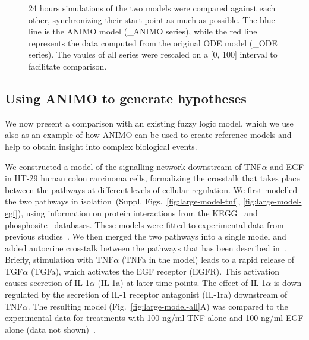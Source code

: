 \documentclass{bmcart}
\begin{document}
\begin{figure}[!htpb]
\begin{center}
\end{center}
\caption{\label{fig:grafici-drosophila-smaller} 24 hours simulations of the two models were compared
against each other, synchronizing their start point as much as possible. The blue line is the ANIMO model
({\sf \_{}ANIMO} series), while the red line represents the data computed from the original ODE model
({\sf \_{}ODE} series). The vaules of all series were rescaled on a [0, 100] interval to facilitate comparison.}
\end{figure}







\subsection*{Using ANIMO to generate hypotheses}\label{subsec:case-study-larger}
We now present a comparison with an existing fuzzy logic model, which we use also as an example of how
ANIMO can be used to create reference models and help to obtain insight into complex biological events.

We constructed a model of the signalling network downstream of TNF$\alpha$ and EGF
in HT-29 human colon carcinoma cells, formalizing
the crosstalk that takes place between the pathways at different levels of cellular regulation.
We first modelled the two pathways in isolation~(Suppl. Figs.~\ref{fig:large-model-tnf}, \ref{fig:large-model-egf}),
using information on protein interactions from
the KEGG~\cite{kegg} and phosphosite~\cite{phosphosite} databases. These models were fitted to experimental data
from previous studies~\cite{pathway-compendium,pathway-autocrine}.
We then merged the two pathways into a single model and added autocrine crosstalk between the pathways that has been
described in~\cite{pathway-autocrine}.
Briefly, stimulation with TNF$\alpha$ ({\sf TNFa} in the model) leads to a rapid release of TGF$\alpha$ ({\sf TGFa}),
which activates the EGF receptor ({\sf EGFR}).
This activation causes secretion of IL-1$\alpha$ ({\sf IL-1a}) at later time points.
The effect of IL-1$\alpha$ is down-regulated by the secretion of IL-1 receptor antagonist ({\sf IL-1ra})
downstream of TNF$\alpha$.
The resulting model (Fig.~\ref{fig:large-model-all}A) was compared to the experimental data
for treatments with 100 ng/ml TNF alone and 100 ng/ml EGF alone (data not shown)~\cite{pathway-compendium}.
\end{document}
